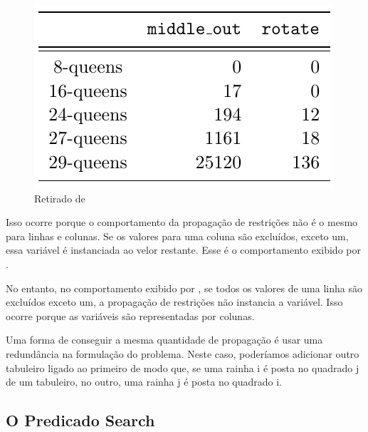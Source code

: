 \documentclass{article}
\begin{document}
\begin{figure}[h]
  \caption{Retirado de \cite{krzysztof}}\label{fig:psi}
  \centering
  \includegraphics[scale=0.5]{rotate.png}
\end{figure}

Isso ocorre porque o comportamento da propagação de restrições não é o mesmo para linhas e colunas.
Se os valores para uma coluna são excluídos, exceto um, essa variável é instanciada ao velor
restante. Esse é o comportamento exibido por .

No entanto, no comportamento exibido por , se todos os valores de uma linha
são excluídos exceto um, a propagação de restrições não instancia a variável. Isso ocorre porque as
variáveis são representadas por colunas.

Uma forma de conseguir a mesma quantidade de propagação é usar uma redundância na formulação do
problema. Neste caso, poderíamos adicionar outro tabuleiro ligado ao primeiro de modo que, se uma
rainha i é posta no quadrado j de um tabuleiro, no outro, uma rainha j é posta no quadrado i.

\subsection{O Predicado Search}
\end{document}
